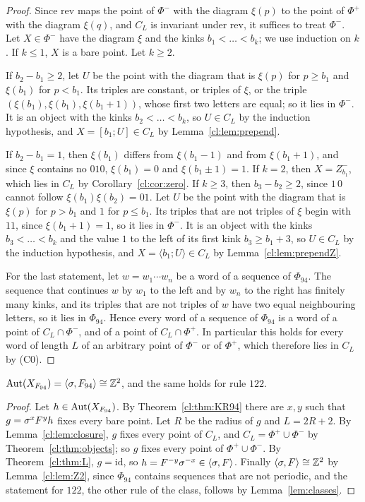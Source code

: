 \begin{proof}
Since $\mathrm{rev}$ maps the point of $\Phi^-$ with the diagram $\xi(p)$ to the point of $\Phi^+$ with the diagram $\xi(q)$, and $C_L$ is invariant under $\mathrm{rev}$, it suffices to treat $\Phi^-$. Let $X\in\Phi^-$ have the diagram $\xi$ and the kinks $b_1<\dots<b_k$; we use induction on $k$. If $k\le1$, $X$ is a bare point. Let $k\ge2$.

If $b_2-b_1\ge2$, let $U$ be the point with the diagram that is $\xi(p)$ for $p\ge b_1$ and $\xi(b_1)$ for $p<b_1$. Its triples are constant, or triples of $\xi$, or the triple $(\xi(b_1),\xi(b_1),\xi(b_1+1))$, whose first two letters are equal; so it lies in $\Phi^-$. It is an object with the kinks $b_2<\dots<b_k$, so $U\in C_L$ by the induction hypothesis, and $X=[b_1;U]\in C_L$ by Lemma~\ref{cl:lem:prepend}.

If $b_2-b_1=1$, then $\xi(b_1)$ differs from $\xi(b_1-1)$ and from $\xi(b_1+1)$, and since $\xi$ contains no $010$, $\xi(b_1)=0$ and $\xi(b_1\pm1)=1$. If $k=2$, then $X=Z^-_{b_1}$, which lies in $C_L$ by Corollary~\ref{cl:cor:zero}. If $k\ge3$, then $b_3-b_2\ge2$, since $1\,0$ cannot follow $\xi(b_1)\xi(b_2)=01$. Let $U$ be the point with the diagram that is $\xi(p)$ for $p>b_1$ and $1$ for $p\le b_1$. Its triples that are not triples of $\xi$ begin with $11$, since $\xi(b_1+1)=1$, so it lies in $\Phi^-$. It is an object with the kinks $b_3<\dots<b_k$ and the value $1$ to the left of its first kink $b_3\ge b_1+3$, so $U\in C_L$ by the induction hypothesis, and $X=\langle b_1;U\rangle\in C_L$ by Lemma~\ref{cl:lem:prependZ}.

For the last statement, let $w=w_1\cdots w_n$ be a word of a sequence of $\Phi_{94}$. The sequence that continues $w$ by $w_1$ to the left and by $w_n$ to the right has finitely many kinks, and its triples that are not triples of $w$ have two equal neighbouring letters, so it lies in $\Phi_{94}$. Hence every word of a sequence of $\Phi_{94}$ is a word of a point of $C_L\cap\Phi^-$, and of a point of $C_L\cap\Phi^+$. In particular this holds for every word of length $L$ of an arbitrary point of $\Phi^-$ or of $\Phi^+$, which therefore lies in $C_L$ by (C0).
\end{proof}

\begin{theorem}\label{cl:thm:dens}
$\operatorname{Aut}(X_{F_{94}})=\langle\sigma,F_{94}\rangle\cong\mathbb{Z}^2$, and the same holds for rule $122$.
\end{theorem}

\begin{proof}
Let $h\in\operatorname{Aut}(X_{F_{94}})$. By Theorem~\ref{cl:thm:KR94} there are $x,y$ such that $g=\sigma^xF^yh$ fixes every bare point. Let $R$ be the radius of $g$ and $L=2R+2$. By Lemma~\ref{cl:lem:closure}, $g$ fixes every point of $C_L$, and $C_L=\Phi^+\cup\Phi^-$ by Theorem~\ref{cl:thm:objects}; so $g$ fixes every point of $\Phi^+\cup\Phi^-$. By Theorem~\ref{cl:thm:L}, $g=\mathrm{id}$, so $h=F^{-y}\sigma^{-x}\in\langle\sigma,F\rangle$. Finally $\langle\sigma,F\rangle\cong\mathbb{Z}^2$ by Lemma~\ref{cl:lem:Z2}, since $\Phi_{94}$ contains sequences that are not periodic, and the statement for $122$, the other rule of the class, follows by Lemma~\ref{lem:classes}.
\end{proof}

